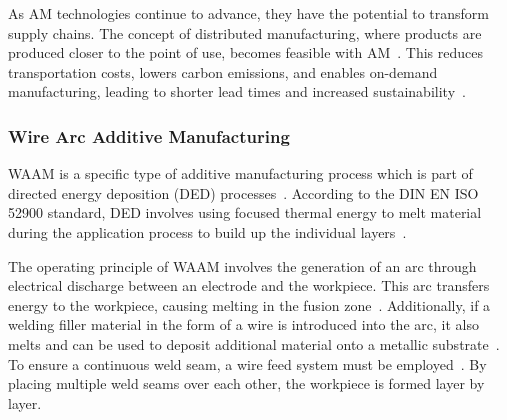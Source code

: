 
As \acrshort{AM} technologies continue to advance, they have the potential to transform supply chains. The concept of distributed manufacturing, where products are produced closer to the point of use, becomes feasible with AM~\cite{Jandyal.2022}. This reduces transportation costs, lowers carbon emissions, and enables on-demand manufacturing, leading to shorter lead times and increased sustainability~\cite{Haleem.2019}.



\subsubsection{Wire Arc Additive Manufacturing}
\acrshort{WAAM} is a specific type of additive manufacturing process which is part of directed energy deposition (\acrshort{DED}) processes~\cite{Svetlizky.2021}. According to the DIN EN ISO 52900 standard, DED involves using focused thermal energy to melt material during the application process to build up the individual layers~\cite{Additive}. 

The operating principle of \acrshort{WAAM} involves the generation of an arc through electrical discharge between an electrode and the workpiece. This arc transfers energy to the workpiece, causing melting in the fusion zone~\cite{Ou.2018}. Additionally, if a welding filler material in the form of a wire is introduced into the arc, it also melts and can be used to deposit additional material onto a metallic substrate~\cite{Cunningham.2018}. To ensure a continuous weld seam, a wire feed system must be employed~\cite{Ding.2015}. By placing multiple weld seams over each other, the workpiece is formed layer by layer.


